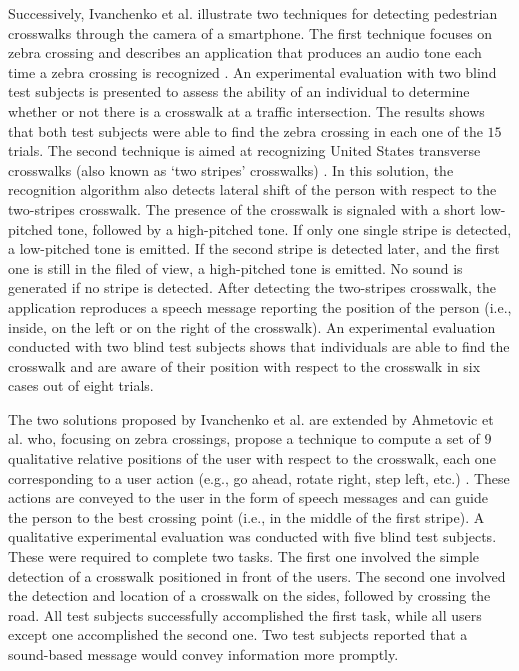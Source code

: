 \documentclass{article}
\begin{document}
Successively, Ivanchenko et al. illustrate two techniques for detecting pedestrian crosswalks through the camera of a smartphone.
The first technique focuses on zebra crossing and describes an application that produces an audio tone each time a zebra crossing is recognized \cite{ivanchenko}.
An experimental evaluation with two blind test subjects is presented to assess the ability of an individual to determine whether or not there is a crosswalk at a traffic intersection.
The results shows that both test subjects were able to find the zebra crossing in each one of the $15$ trials.
The second technique is aimed at recognizing United States transverse crosswalks (also known as `two stripes' crosswalks) \cite{ivanchenko2}.
In this solution, the recognition algorithm also detects lateral shift of the person with respect to the two-stripes crosswalk.
The presence of the crosswalk is signaled with a short low-pitched tone, followed by a high-pitched tone. If only one single stripe is detected, a low-pitched tone is emitted. If the second stripe is detected later, and the first one is still in the filed of view, a high-pitched tone is emitted. No sound is generated if no stripe is detected.
After detecting the two-stripes crosswalk, the application reproduces a speech message reporting the position of the person (i.e., inside, on the left or on the right of the crosswalk).
An experimental evaluation conducted with two blind test subjects shows that individuals are able to find the crosswalk and are aware of their position with respect to the crosswalk in six cases out of eight trials.

The two solutions proposed by Ivanchenko et al. are extended by Ahmetovic et al. who, focusing on zebra crossings, propose a technique to compute a set of $9$ qualitative relative positions of the user with respect to the crosswalk, each one corresponding to a user action (e.g., go ahead, rotate right, step left, etc.) \cite{dragan}.
These actions are conveyed to the user in the form of speech messages and can guide the person to the best crossing point (i.e., in the middle of the first stripe).
A qualitative experimental evaluation was conducted with five blind test subjects. These were required to complete two tasks. The first one involved the simple detection of a crosswalk positioned in front of the users. The second one involved the detection and location of a crosswalk on the sides, followed by crossing the road.
All test subjects successfully accomplished the first task, while all users except one accomplished the second one.
Two test subjects reported that a sound-based message would convey information more promptly.
\end{document}
